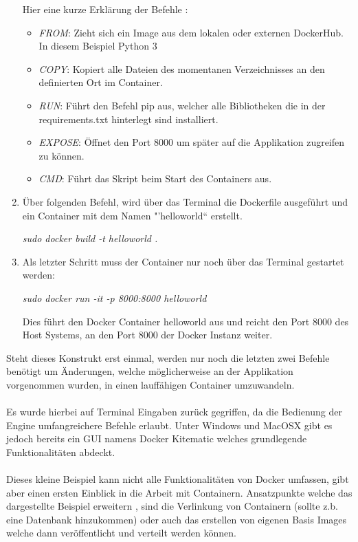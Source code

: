 \documentclass[12pt,toc=bib,toc=listof]{scrreprt}
\begin{document}
\begin{enumerate}[leftmargin=*]
Hier eine kurze Erklärung der Befehle :
\begin{itemize}
	\item \textit{FROM}: Zieht sich ein Image aus dem lokalen oder externen DockerHub. In diesem Beispiel Python 3
	\item \textit{COPY}: Kopiert alle Dateien des momentanen Verzeichnisses an den definierten Ort im Container.
	\item \textit{RUN}: Führt den Befehl pip aus, welcher alle Bibliotheken die in der requirements.txt hinterlegt sind installiert.
	\item \textit{EXPOSE}: Öffnet den Port 8000 um später auf die Applikation zugreifen zu können.
	\item \textit{CMD}: Führt das Skript beim Start des Containers aus.
\end{itemize}

\item Über folgenden Befehl, wird über das Terminal die Dockerfile ausgeführt und ein Container mit dem Namen "'helloworld“ erstellt.

\textit{sudo docker build -t helloworld .}

\item Als letzter Schritt muss der Container nur noch  über das Terminal gestartet werden:

\textit{sudo docker run -it -p 8000:8000 helloworld}

Dies führt den Docker Container helloworld aus und reicht den Port 8000 des Host Systems, an den Port 8000 der Docker Instanz weiter.
\end{enumerate}
Steht dieses Konstrukt erst einmal, werden nur noch die letzten zwei Befehle benötigt um Änderungen, welche möglicherweise an der Applikation vorgenommen wurden, in einen lauffähigen Container umzuwandeln.\\
\\
Es wurde hierbei auf Terminal Eingaben zurück gegriffen, da die Bedienung der Engine umfangreichere Befehle erlaubt. Unter Windows und MacOSX gibt es jedoch bereits ein GUI namens Docker Kitematic welches grundlegende Funktionalitäten abdeckt.\\
\\
Dieses kleine Beispiel kann nicht alle Funktionalitäten von Docker umfassen, gibt aber einen ersten Einblick in die Arbeit mit Containern.
Ansatzpunkte welche das dargestellte Beispiel erweitern , sind die Verlinkung von Containern (sollte z.b. eine Datenbank hinzukommen) oder auch das erstellen von eigenen Basis Images welche dann veröffentlicht und verteilt werden können.
\end{document}
